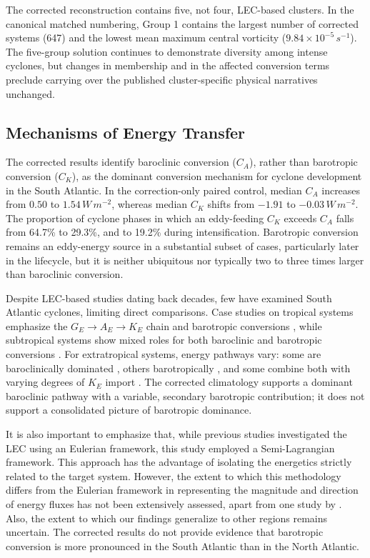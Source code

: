 \documentclass[pdflatex,sn-chicago]{sn-jnl}%
\theoremstyle{plain}
\theoremstyle{definition}
\theoremstyle{remark}
\theoremstyle{definition}
\begin{document}
The corrected reconstruction contains five, not four, LEC-based clusters. In the canonical matched numbering, Group 1 contains the largest number of corrected systems (647) and the lowest mean maximum central vorticity ($9.84\times10^{-5}\,s^{-1}$). The five-group solution continues to demonstrate diversity among intense cyclones, but changes in membership and in the affected conversion terms preclude carrying over the published cluster-specific physical narratives unchanged.

\subsection{Mechanisms of Energy Transfer}

The corrected results identify baroclinic conversion ($C_A$), rather than barotropic conversion ($C_K$), as the dominant conversion mechanism for cyclone development in the South Atlantic. In the correction-only paired control, median $C_A$ increases from $0.50$ to $1.54\,W\,m^{-2}$, whereas median $C_K$ shifts from $-1.91$ to $-0.03\,W\,m^{-2}$. The proportion of cyclone phases in which an eddy-feeding $C_K$ exceeds $C_A$ falls from 64.7\% to 29.3\%, and to 19.2\% during intensification. Barotropic conversion remains an eddy-energy source in a substantial subset of cases, particularly later in the lifecycle, but it is neither ubiquitous nor typically two to three times larger than baroclinic conversion.

Despite LEC-based studies dating back decades, few have examined South Atlantic cyclones, limiting direct comparisons. Case studies on tropical systems emphasize the $G_E \rightarrow A_E \rightarrow K_E$ chain and barotropic conversions \citep{brennan1980zonal,veiga2008analysis}, while subtropical systems show mixed roles for both baroclinic and barotropic conversions \citep{michaelides1987limited,dias2013synoptic,pezza2014large,cavicchia2018energetics}. For extratropical systems, energy pathways vary: some are baroclinically dominated \citep{dias2011energy,black2013universal}, others barotropically \citep{michaelides1992spatial,dias2011energy}, and some combine both with varying degrees of $K_E$ import \citep{wahab2002mechanism,bulic2006limited,pezza2010environmental}. The corrected climatology supports a dominant baroclinic pathway with a variable, secondary barotropic contribution; it does not support a consolidated picture of barotropic dominance.

It is also important to emphasize that, while previous studies investigated the LEC using an Eulerian framework, this study employed a Semi-Lagrangian framework. This approach has the advantage of isolating the energetics strictly related to the target system. However, the extent to which this methodology differs from the Eulerian framework in representing the magnitude and direction of energy fluxes has not been extensively assessed, apart from one study by \citet{michaelides1999quasi}. Also, the extent to which our findings generalize to other regions remains uncertain. The corrected results do not provide evidence that barotropic conversion is more pronounced in the South Atlantic than in the North Atlantic.
\end{document}
